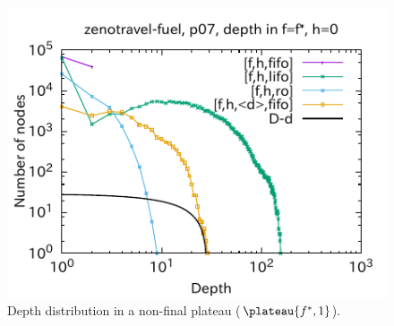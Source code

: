 \begin{figure}[htbp]
\includegraphics{img/output-lmcut1/zenotravel-fuel/p07.pdf}
 \caption{Depth distribution in a non-final plateau ($\plateau{f^*,1}$).}
 \label{fig:depth-histogram5}
\end{figure}

